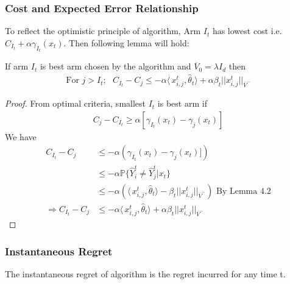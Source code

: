 \subsubsection{Cost and Expected Error Relationship}
To reflect the optimistic principle of algorithm, Arm $I_t$ has lowest cost i.e. $C_{I_t} + \alpha\gamma_{I_t}(x_t)$. Then following lemma will hold:
\begin{lemma}
	\label{lem:cost_err}
	If arm $I_t$ is best arm chosen by the algorithm and $\overline{V}_0 = \lambda I_d$ then
	\begin{align*}
	\text{For } j > I_t; \text{ } C_{I_t} - C_j \leq -\alpha\langle\,x_{i,j}^t,\widehat{\theta}_t\rangle + \alpha \beta_t||x_{i,j}^t||_{\overline{V}^-} 
	\end{align*}
\end{lemma}
\begin{proof} From optimal criteria, smallest $I_t$ is best arm if 
	\begin{align*}
	C_j - C_{I_t} \geq  \alpha[\gamma_{I_t}(x_t) - \gamma_j(x_t)]
	\end{align*}
	We have
	\begin{align*}
	C_{I_t} - C_j &\leq  -\alpha(\gamma_{I_t}(x_t) - \gamma_j(x_t)]) \\
	&\leq  -\alpha\mathbb{P}\{\widehat{Y}_i^t \neq \widehat{Y}_j^t|x_t\}  \nonumber \\
	&\leq  -\alpha(\langle\,x_{i,j}^t,\widehat{\theta}_t\rangle -  \beta_t||x_{i,j}^t||_{\overline{V}^-}) \mbox{ By Lemma } 4.2\\
	\Rightarrow C_{I_t} - C_j &\leq -\alpha\langle\,x_{i,j}^t,\widehat{\theta}_t\rangle + \alpha \beta_t||x_{i,j}^t||_{\overline{V}^-} 
	\end{align*}
\end{proof}



\subsubsection{Instantaneous Regret}
\label{sec:ra_ir}
The instantaneous regret of algorithm is the regret incurred for any time t. 

